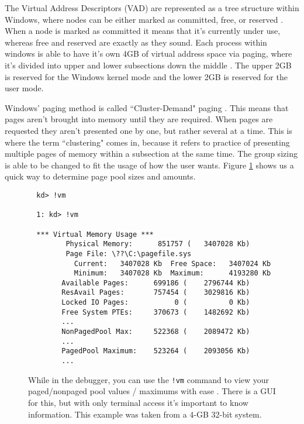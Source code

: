 \par The Virtual Address Descriptors (VAD) are represented as a tree structure within Windows, where nodes can be either marked as committed, free, or reserved \cite{win:2}.
When a node is marked as committed it means that it's currently under use, whereas free and reserved are exactly as they sound.
Each process within windows is able to have it's own 4GB of virtual address space via paging, where it's divided into upper and lower subsections down the middle \cite{win:2}.
The upper 2GB is reserved for the Windows kernel mode and the lower 2GB is reserved for the user mode.

\par Windows' paging method is called ``Cluster-Demand" paging \cite{win:2}.
This means that pages aren't brought into memory until they are required.
When pages are requested they aren't presented one by one, but rather several at a time.
This is where the term ``clustering" comes in, because it refers to practice of presenting multiple pages of memory within a subsection at the same time.
The group sizing is able to be changed to fit the usage of how the user wants.
Figure \ref{code:determining_pool_sizes} shows us a quick way to determine page pool sizes and amounts.

\begin{figure}[h]
\begin{lstlisting}
  kd> !vm

  1: kd> !vm

  *** Virtual Memory Usage ***
         Physical Memory:      851757 (   3407028 Kb)
         Page File: \??\C:\pagefile.sys
           Current:   3407028 Kb  Free Space:   3407024 Kb
           Minimum:   3407028 Kb  Maximum:      4193280 Kb
        Available Pages:      699186 (    2796744 Kb)
        ResAvail Pages:       757454 (    3029816 Kb)
        Locked IO Pages:           0 (          0 Kb)
        Free System PTEs:     370673 (    1482692 Kb)
        ...
        NonPagedPool Max:     522368 (    2089472 Kb)
        ...
        PagedPool Maximum:    523264 (    2093056 Kb)
        ...
\end{lstlisting}
\centering
\captionsetup{justification=centering}
\caption{
  While in the debugger, you can use the \texttt{!vm} command to view your paged/nonpaged pool values / maximums with ease \cite{win:2}.
  There is a GUI for this, but with only terminal access it's important to know information.
  This example was taken from a 4-GB 32-bit system.
}
\label{code:determining_pool_sizes}
\end{figure}

